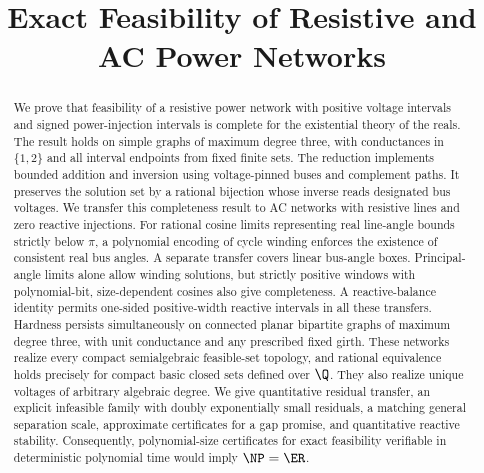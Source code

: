 \documentclass[11pt]{article}
\title{Exact Feasibility of Resistive and AC Power Networks}
\author{}
\date{}
\begin{document}
\maketitle
\begin{abstract}
We prove that feasibility of a resistive power network with positive voltage
intervals and signed power-injection intervals is complete for the existential
theory of the reals. The result holds on simple graphs of maximum degree three,
with conductances in $\{1,2\}$ and all interval endpoints from fixed finite sets.
The reduction implements bounded addition and inversion using voltage-pinned
buses and complement paths. It preserves the solution set by a rational
bijection whose inverse reads designated bus voltages. We transfer this
completeness result to AC networks with resistive lines and zero reactive
injections. For rational cosine limits representing real line-angle bounds
strictly below $\pi$, a polynomial encoding of cycle winding enforces the
existence of consistent real bus angles. A separate transfer covers linear
bus-angle boxes. Principal-angle limits alone allow winding solutions, but
strictly positive windows with polynomial-bit, size-dependent cosines also
give completeness. A reactive-balance identity permits one-sided
positive-width reactive intervals in all these transfers. Hardness persists
simultaneously on connected planar bipartite graphs of maximum degree three,
with unit conductance and any prescribed fixed girth. These networks realize
every compact semialgebraic feasible-set topology, and rational equivalence
holds precisely for compact basic closed sets defined over $\Q$.
They also realize unique voltages of
arbitrary algebraic degree. We give quantitative residual transfer, an
explicit infeasible family with doubly exponentially small residuals, a
matching general separation scale, approximate certificates for a gap
promise, and quantitative reactive stability. Consequently,
polynomial-size certificates for exact
feasibility verifiable in deterministic polynomial time would imply
$\NP=\ER$.
\end{abstract}






\appendix



\end{document}
